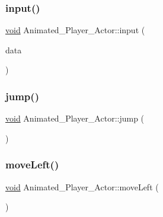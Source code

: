\mbox{\label{classAnimated__Player__Actor_a2528c4e08b2b78ceb360176000f2c585}} 
\subsubsection{\texorpdfstring{input()}{input()}}
{\footnotesize\ttfamily \hyperlink{imgui__impl__opengl3__loader_8h_ac668e7cffd9e2e9cfee428b9b2f34fa7}{void} Animated\+\_\+\+Player\+\_\+\+Actor\+::input (\begin{DoxyParamCaption}\item[{\hyperlink{structGameData}{Game\+Data} $\ast$}]{data }\end{DoxyParamCaption})}

\mbox{\label{classAnimated__Player__Actor_a05ff973dde6e3409c66b933407748997}} 
\subsubsection{\texorpdfstring{jump()}{jump()}}
{\footnotesize\ttfamily \hyperlink{imgui__impl__opengl3__loader_8h_ac668e7cffd9e2e9cfee428b9b2f34fa7}{void} Animated\+\_\+\+Player\+\_\+\+Actor\+::jump (\begin{DoxyParamCaption}{ }\end{DoxyParamCaption})}

\mbox{\label{classAnimated__Player__Actor_a2a16f88ffccdd67e6d7f0df4a9374754}} 
\subsubsection{\texorpdfstring{move\+Left()}{moveLeft()}}
{\footnotesize\ttfamily \hyperlink{imgui__impl__opengl3__loader_8h_ac668e7cffd9e2e9cfee428b9b2f34fa7}{void} Animated\+\_\+\+Player\+\_\+\+Actor\+::move\+Left (\begin{DoxyParamCaption}{ }\end{DoxyParamCaption})}

